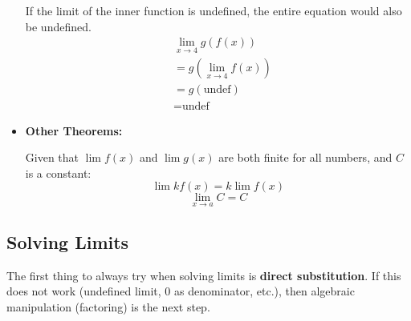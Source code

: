 \documentclass[12pt]{article}
\begin{document}
\begin{itemize}
          If the limit of the inner function is undefined, the entire equation would also be undefined.
          \begin{align*}
               & \lim_{x \to 4} g\left( f(x) \right)   \\
               & = g\left( \lim_{x \to 4} f(x) \right) \\
               & = g(\text{undef})                     \\
               & = \text{undef}
          \end{align*}
          \smallskip

    \item \textbf{Other Theorems:}

          Given that $\lim f(x)$ and $\lim g(x)$ are both finite for all numbers, and $C$ is a constant:
          \[ \lim k f(x) = k \lim f(x) \]
          \[ \lim_{x \to a} C = C \]
          \smallskip
\end{itemize}

\begin{figure}[H]
    \begin{center}
        \caption[Figure 2]{}
        \label{fig:limproperties}
    \end{center}
\end{figure}

\subsection{Solving Limits}
The first thing to always try when solving limits is \textbf{direct substitution}. If this does not work (undefined limit, 0 as denominator, etc.), then algebraic manipulation (factoring) is the next step.
\end{document}
